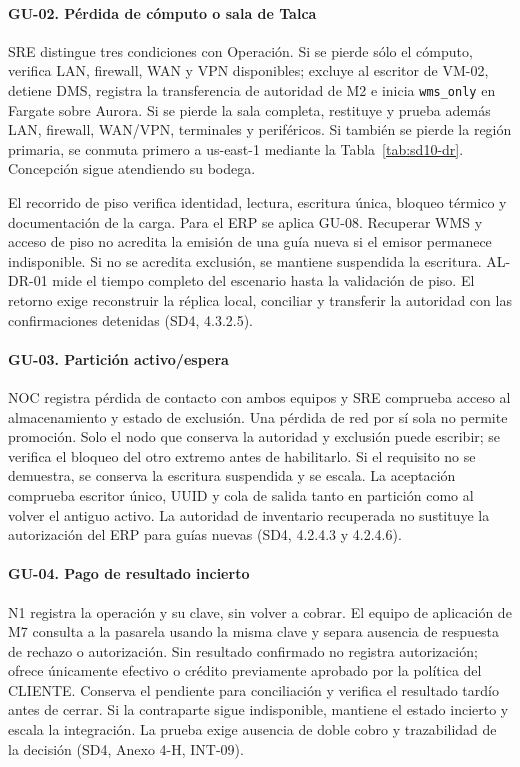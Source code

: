 \Needspace{0.19\textheight}
\paragraph*{GU-02. Pérdida de cómputo o sala de Talca}
SRE distingue tres condiciones con Operación. Si se pierde sólo el cómputo, verifica LAN, firewall, WAN y VPN disponibles; excluye al escritor de VM-02, detiene DMS, registra la transferencia de autoridad de M2 e inicia \texttt{wms\_only} en Fargate sobre Aurora. Si se pierde la sala completa, restituye y prueba además LAN, firewall, WAN/VPN, terminales y periféricos. Si también se pierde la región primaria, se conmuta primero a us-east-1 mediante la Tabla~\ref{tab:sd10-dr}. Concepción sigue atendiendo su bodega.

El recorrido de piso verifica identidad, lectura, escritura única, bloqueo térmico y documentación de la carga. Para el ERP se aplica GU-08. Recuperar WMS y acceso de piso no acredita la emisión de una guía nueva si el emisor permanece indisponible. Si no se acredita exclusión, se mantiene suspendida la escritura. AL-DR-01 mide el tiempo completo del escenario hasta la validación de piso. El retorno exige reconstruir la réplica local, conciliar y transferir la autoridad con las confirmaciones detenidas (SD4, 4.3.2.5).

\Needspace{0.19\textheight}
\paragraph*{GU-03. Partición activo/espera}
NOC registra pérdida de contacto con ambos equipos y SRE comprueba acceso al almacenamiento y estado de exclusión. Una pérdida de red por sí sola no permite promoción. Solo el nodo que conserva la autoridad y exclusión puede escribir; se verifica el bloqueo del otro extremo antes de habilitarlo. Si el requisito no se demuestra, se conserva la escritura suspendida y se escala. La aceptación comprueba escritor único, UUID y cola de salida tanto en partición como al volver el antiguo activo. La autoridad de inventario recuperada no sustituye la autorización del ERP para guías nuevas (SD4, 4.2.4.3 y 4.2.4.6).

\Needspace{0.19\textheight}
\paragraph*{GU-04. Pago de resultado incierto}
N1 registra la operación y su clave, sin volver a cobrar. El equipo de aplicación de M7 consulta a la pasarela usando la misma clave y separa ausencia de respuesta de rechazo o autorización. Sin resultado confirmado no registra autorización; ofrece únicamente efectivo o crédito previamente aprobado por la política del CLIENTE. Conserva el pendiente para conciliación y verifica el resultado tardío antes de cerrar. Si la contraparte sigue indisponible, mantiene el estado incierto y escala la integración. La prueba exige ausencia de doble cobro y trazabilidad de la decisión (SD4, Anexo 4-H, INT-09).

